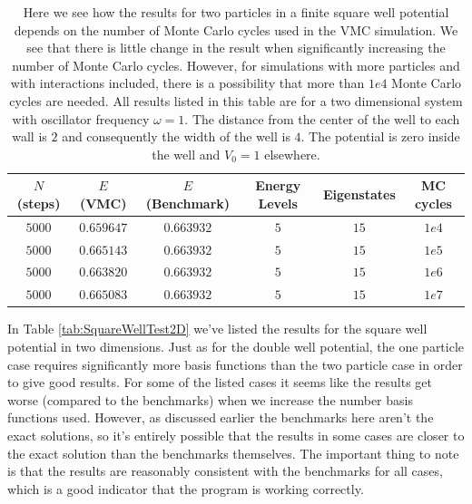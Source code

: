 \documentclass[../main.tex]{subfiles}
\begin{document}
\begin{table}[!ht]
  \centering
  \begin{tabular}{ | c | c | c | c | c | c | }
    \hline
    $N$ (steps) & $E$ (VMC) & $E$ (Benchmark) &  Energy Levels & Eigenstates & MC cycles\\*
    \hline
    $5000$ & $0.659647$ & $0.663932$ & $5$ & $15$ & $1e4$ \\*
    \hline
    $5000$ & $0.665143$ & $0.663932$ & $5$ & $15$ & $1e5$ \\*
    \hline
    $5000$ & $0.663820$ & $0.663932$ & $5$ & $15$ & $1e6$ \\*
    \hline
    $5000$ & $0.665083$ & $0.663932$ & $5$ & $15$ & $1e7$ \\*
    \hline
  \end{tabular}
  \caption{Here we see how the results for two particles in a finite square well potential depends on the number of Monte Carlo cycles used in the VMC simulation. We see that there is little change in the result when significantly increasing the number of Monte Carlo cycles. However, for simulations with more particles and with interactions included, there is a possibility that more than $1e4$ Monte Carlo cycles are needed. All results listed in this table are for a two dimensional system with oscillator frequency $\omega = 1$. The distance from the center of the well to each wall is $2$ and consequently the width of the well is $4$. The potential is zero inside the well and $V_0 = 1$ elsewhere.}
  \label{tab:SquareWellMCcyclesTest2D}
\end{table}

In Table \ref{tab:SquareWellTest2D} we've listed the results for the square well potential in two dimensions. Just as for the double well potential, the one particle case requires significantly more basis functions than the two particle case in order to give good results. For some of the listed cases it seems like the results get worse (compared to the benchmarks) when we increase the number basis functions used. However, as discussed earlier the benchmarks here aren't the exact solutions, so it's entirely possible that the results in some cases are closer to the exact solution than the benchmarks themselves. The important thing to note is that the results are reasonably consistent with the benchmarks for all cases, which is a good indicator that the program is working correctly.
\end{document}

